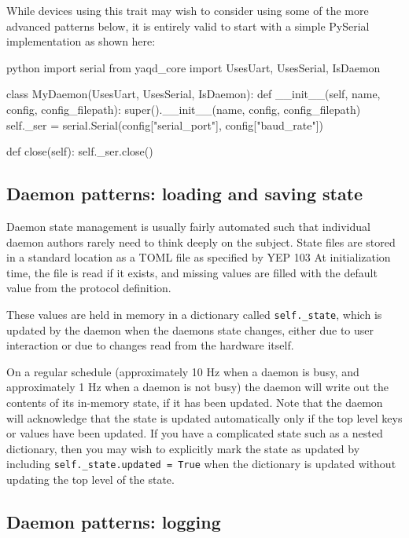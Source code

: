 While devices using this trait may wish to consider using some of the more advanced patterns below, it is entirely valid to start with a simple PySerial\cite{} implementation as shown here:

\begin{codefragment}{python}
import serial
from yaqd_core import UsesUart, UsesSerial, IsDaemon

class MyDaemon(UsesUart, UsesSerial, IsDaemon):
    def __init__(self, name, config, config_filepath):
        super().__init__(name, config, config_filepath)
        self._ser = serial.Serial(config["serial_port"], config["baud_rate"])

    def close(self):
        self._ser.close()
\end{codefragment}


\subsection{Daemon patterns: loading and saving state}

Daemon state management is usually fairly automated such that individual daemon authors rarely need to think deeply on the subject.
State files are stored in a standard location as a TOML file as specified by YEP 103\cite{}
At initialization time, the file is read if it exists, and missing values are filled with the default value from the protocol definition.

These values are held in memory in a dictionary called \texttt{self.\_state}, which is updated by the daemon when the daemons state changes, either due to user interaction or due to changes read from the hardware itself.

On a regular schedule (approximately 10 Hz when a daemon is busy, and approximately 1 Hz when a daemon is not busy) the daemon will write out the contents of its in-memory state, if it has been updated.
Note that the daemon will acknowledge that the state is updated automatically only if the top level keys or values have been updated.
If you have a complicated state such as a nested dictionary, then you may wish to explicitly mark the state as updated by including \texttt{self.\_state.updated = True} when the dictionary is updated without updating the top level of the state.

\subsection{Daemon patterns: logging}

